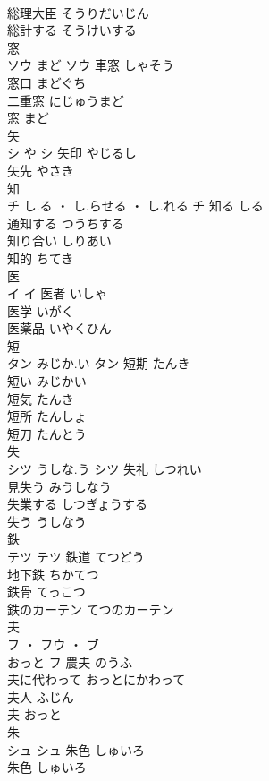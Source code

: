 \documentclass[8pt]{extreport}
\begin{document}
\begin{CJK}{UTF8}{min}
\\	総理大臣	そうりだいじん	
\\	総計する	そうけいする	
\\	窓	
\\	ソウ	まど	ソウ	車窓	しゃそう	
\\	窓口	まどぐち	
\\	二重窓	にじゅうまど	
\\	窓	まど	
\\	矢	
\\	シ	や	シ	矢印	やじるし	
\\	矢先	やさき	
\\	知	
\\	チ	し.る ・ し.らせる ・ し.れる	チ	知る	しる	
\\	通知する	つうちする	
\\	知り合い	しりあい	
\\	知的	ちてき	
\\	医	
\\	イ		イ	医者	いしゃ	
\\	医学	いがく	
\\	医薬品	いやくひん	
\\	短	
\\	タン	みじか.い	タン	短期	たんき	
\\	短い	みじかい	
\\	短気	たんき	
\\	短所	たんしょ	
\\	短刀	たんとう	
\\	失	
\\	シツ	うしな.う	シツ	失礼	しつれい	
\\	見失う	みうしなう	
\\	失業する	しつぎょうする	
\\	失う	うしなう	
\\	鉄	
\\	テツ		テツ	鉄道	てつどう	
\\	地下鉄	ちかてつ	
\\	鉄骨	てっこつ	
\\	鉄のカーテン	てつのカーテン	
\\	夫	
\\	フ ・ フウ ・ ブ
\\	おっと	フ	農夫	のうふ	
\\	夫に代わって	おっとにかわって	
\\	夫人	ふじん	
\\	夫	おっと	
\\	朱	
\\	シュ		シュ	朱色	しゅいろ	
\\	朱色	しゅいろ	

\end{CJK}
\end{document}
